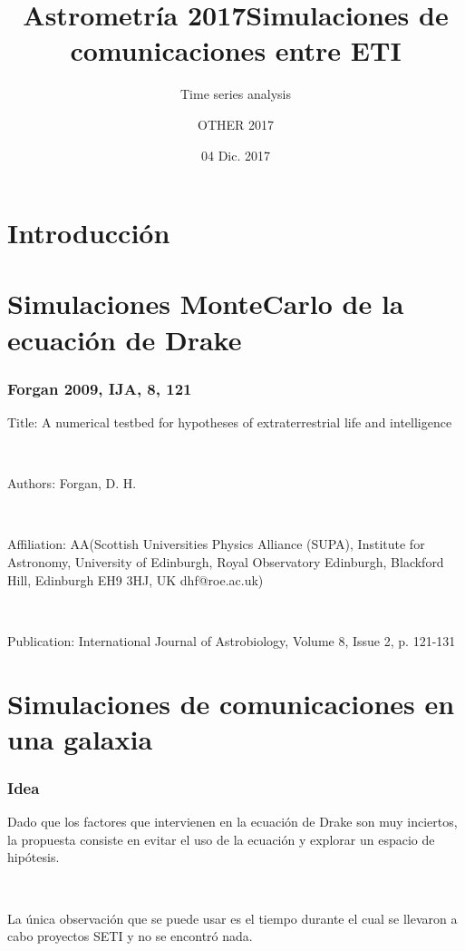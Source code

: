\documentclass[handout]{beamer}
\author[]{Time series analysis}
\title[]{\textbf{Astrometría 2017}}
\date {\tiny{04 Dic. 2017}}
\institute[]{}%
\theoremstyle{plain}
\theoremstyle{definition}
\theoremstyle{remark}
\begin{document}
\author{OTHER 2017}
\title{Simulaciones de comunicaciones entre ETI}
\maketitle

\footnotesize


\section{Introducci\'on}


\section{Simulaciones MonteCarlo de la ecuación de Drake}

\begin{frame}\frametitle{Forgan 2009, IJA, 8, 121}
\centering

Title: A numerical testbed for hypotheses of extraterrestrial life and intelligence

\

Authors:	Forgan, D. H.

\

Affiliation:	AA(Scottish Universities Physics Alliance (SUPA), Institute for Astronomy, University of Edinburgh, Royal Observatory Edinburgh, Blackford Hill, Edinburgh EH9 3HJ, UK dhf@roe.ac.uk)

\

Publication:	International Journal of Astrobiology, Volume 8, Issue 2, p. 121-131
\end{frame}%


\section{Simulaciones de comunicaciones en una galaxia}

\begin{frame}\frametitle{Idea}

   Dado que los factores que intervienen en la ecuación de Drake son
   muy inciertos, la propuesta consiste en evitar el uso de la
   ecuación y explorar un espacio de hipótesis.

   \ 

   La única observación que se puede usar es el tiempo durante el cual
   se llevaron a cabo proyectos SETI y no se encontró nada.

\end{frame}%
         
\end{document}
